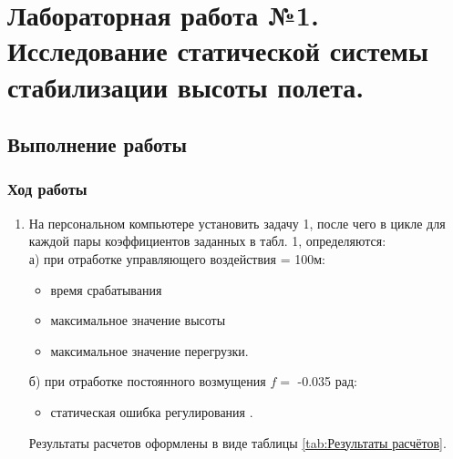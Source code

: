 \documentclass[a4paper,12pt]{article}
\begin{document}
\section{Лабораторная работа №1. Исследование статической системы стабилизации высоты полета.}
\subsection{Выполнение работы}
    \subsubsection{Ход работы}
    
    \begin{enumerate}
    \item На персональном компьютере установить задачу 1, после чего в цикле для
    каждой   пары   коэффициентов  заданных   в  табл.   1,
    определяются:\\
    а)	при отработке управляющего воздействия  = 100м:
        \begin{itemize}
            \item время срабатывания   
            \item максимальное значение высоты  
            \item максимальное значение перегрузки.
        \end{itemize}
    б)	при отработке постоянного возмущения $f=$ -0.035 рад:
        \begin{itemize}
            \item статическая ошибка регулирования .
        \end{itemize}
    
    Результаты расчетов оформлены в виде таблицы \ref{tab:Результаты расчётов}.


\end{enumerate}
\end{document}
